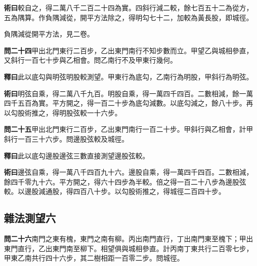 \documentclass[12pt,a4paper]{article}
\newcommand{\Section}[1]{\subsection*{#1}}
\begin{document}
\vspace{0.3em}

\noindent\textbf{術曰}\quad 較自之，得二萬八千二百二十四為實。四斜行減二較，餘七百五十二為從方，五為隅算。作負隅減從，開平方法除之，得明勾七十二，加較為黃長股，即城徑。

\vspace{0.3em}

負隅減從開平方法，見二卷。

\vspace{0.5em}

\noindent\textbf{問二十四}\quad 甲出北門東行二百步，乙出東門南行不知步數而立。甲望乙與城相參直，又斜行一百七十步與乙相會。問乙南行不及甲東行幾何。

\vspace{0.3em}

\noindent\textbf{釋曰}\quad 此以底勾與明弦明股較測望。甲東行為底勾，乙南行為明股，甲斜行為明弦。

\vspace{0.3em}

\noindent\textbf{術曰}\quad 明弦自乘，得二萬八千九百。明股自乘，得一萬四千四百。二數相減，餘一萬四千五百為實。平方開之，得一百二十步為底勾減數。以底勾減之，餘八十步。再以勾股術推之，得明股弦較一十六步。

\vspace{0.5em}

\noindent\textbf{問二十五}\quad 甲出北門東行二百步，乙出東門南行一百二十步。甲斜行與乙相會，計甲斜行一百三十六步。問邊股弦較及城徑。

\vspace{0.3em}

\noindent\textbf{釋曰}\quad 此以底勾邊股邊弦三數直接測望邊股弦較。

\vspace{0.3em}

\noindent\textbf{術曰}\quad 邊弦自乘，得一萬八千四百九十六。邊股自乘，得一萬四千四百。二數相減，餘四千零九十六。平方開之，得六十四步為半較。倍之得一百二十八步為邊股弦較。以邊股減通股，得四百八十步。以勾股術推之，得城徑二百四十步。

\Section{雜法測望六}

\noindent\textbf{問二十六}\quad 南門之東有槐，東門之南有柳。丙出南門直行，丁出南門東至槐下；甲出東門直行，乙出東門南至柳下。相望俱與城相參直。計丙南丁東共行二百零七步，甲東乙南共行四十六步，其二樹相距一百零二步。問城徑。
\end{document}

